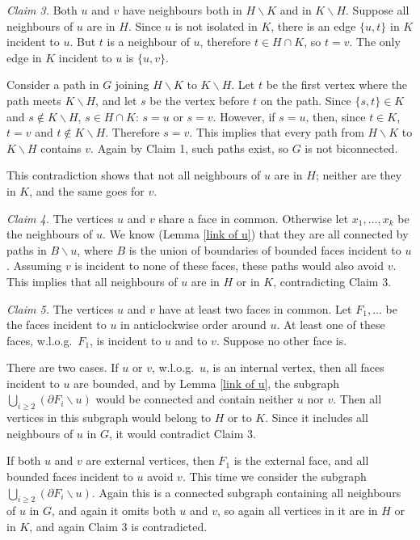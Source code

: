 {\em Claim 3.}
Both $u$ and $v$ have neighbours both in $H\backslash K$ and
in $K\backslash H$. Suppose all neighbours of $u$ are in $H$.
Since $u$ is not isolated in $K$, there is an edge
$\{u,t\}$ in $K$ incident to $u$.  But $t$ is a neighbour
of $u$, therefore $t\in H\cap K$, so $t=v$.  The only
edge in $K$ incident to $u$ is $\{u,v\}$.

Consider a path in $G$
joining $H\backslash K$ to $K\backslash H$. Let
$t$ be the first vertex where the path meets $K\backslash H$,
and let $s$ be the vertex before $t$ on the path. Since
$\{s,t\}\in K$ and $s\notin K\backslash H$, $s\in H\cap K$:
$s=u$ or $s=v$.  However, if $s=u$, then, since $t\in K$,
$t=v$ and $t\notin K\backslash H$.  Therefore $s=v$.  This
implies that every path from $H\backslash K$ to $K\backslash H$
contains $v$. Again by Claim 1, such paths exist, so
$G$ is not biconnected.

This contradiction shows
that not all neighbours of $u$ are in $H$; neither are
they in $K$, and the same goes for $v$.

{\em Claim 4.} The vertices $u$ and $v$ share a face in common.
Otherwise let $x_1,\ldots,x_k$ be the neighbours
of $u$.  We know (Lemma \ref{link of u}) that
they are all connected by paths in $B\backslash u$,
where $B$ is the union of boundaries of bounded
faces incident to $u$.  Assuming $v$ is incident to none
of these faces, these
paths would also avoid $v$. This implies that all neighbours
of $u$ are in $H$ or in $K$, contradicting Claim 3.


{\em Claim 5.} The vertices $u$ and $v$ have at least two
faces in common.  Let
$F_1,\ldots$ be the faces incident
to $u$ in anticlockwise order around $u$.  At least
one of these faces, w.l.o.g.\ $F_1$, is incident to $u$ and to $v$.
Suppose no other face is.

There are two cases.
If $u$ or $v$, w.l.o.g.\ $u$, is an internal vertex, then
all faces incident to $u$ are bounded, and by Lemma
\ref{link of u}, the subgraph
$\bigcup_{i\geq 2} (\partial F_i \backslash u)$ would
be connected and contain neither $u$ nor $v$.  Then
all vertices in this subgraph would belong to $H$
or to $K$.  Since it includes all neighbours of $u$
in $G$, it would contradict Claim 3.

If both $u$ and $v$ are external vertices, then $F_1$
is the external face,
and all bounded faces incident to $u$ avoid $v$.
This time we consider the subgraph
$\bigcup_{i\geq 2} (\partial F_i \backslash u)$.
Again this is
a connected subgraph containing all neighbours of $u$
in $G$, and again it omits both $u$ and $v$, so
again all vertices in it are in $H$ or in $K$, and
again Claim 3 is contradicted.

